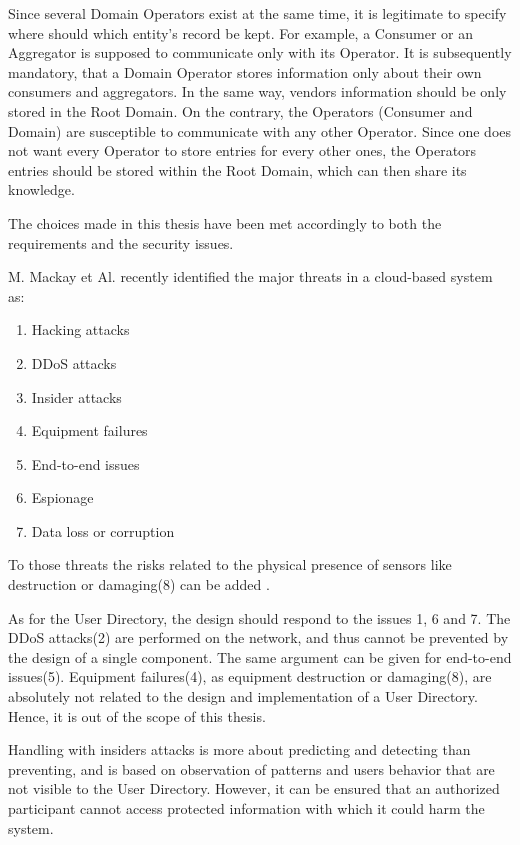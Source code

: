 Since several Domain Operators exist at the same time, it is legitimate to specify where should which entity's record be kept. For example, a Consumer or an Aggregator is supposed to communicate only with its Operator. It is subsequently mandatory, that a Domain Operator stores information only about their own consumers and aggregators. In the same way, vendors information should be only stored in the Root Domain. On the contrary, the Operators (Consumer and Domain) are susceptible to communicate with any other Operator. Since one does not want every Operator to store entries for every other ones, the Operators entries should be stored within the Root Domain, which can then share its knowledge. 

The choices made in this thesis have been met accordingly to both the requirements and the security issues.

M. Mackay et Al. recently identified the major threats in a cloud-based system as\cite{Mackay2012}: 
\begin{enumerate}
	\item Hacking attacks
	\item DDoS attacks
	\item Insider attacks
	\item Equipment failures
	\item End-to-end issues
	\item Espionage
	\item Data loss or corruption
\end{enumerate}

To those threats the risks related to the physical presence of sensors like destruction or damaging(8) can be added .

As for the User Directory, the design should respond to the issues 1, 6 and 7. The DDoS attacks(2) are performed on the network, and thus cannot be prevented by the design of a single component. The same argument can be given for end-to-end issues(5). Equipment failures(4), as equipment destruction or damaging(8), are absolutely not related to the design and implementation of a User Directory. Hence, it is out of the scope of this thesis. 

Handling with insiders attacks is more about predicting and detecting than preventing, and is based on observation of patterns and users behavior that are not visible to the User Directory\cite{Schultz2002}. However, it can be ensured that an authorized participant cannot access protected information with which it could harm the system.

